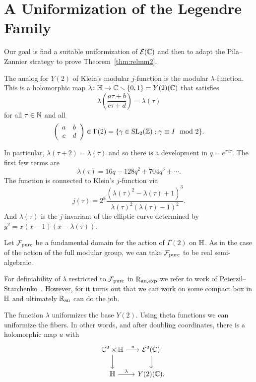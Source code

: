 \section{A Uniformization of the Legendre Family}
\label{sec:unilegendre}
Our goal is find a suitable uniformization of ${\mathcal E}({\mathbb{C}})$ and then
to adapt the Pila--Zannier strategy to prove Theorem~\ref{thm:relmm2}.

The analog for $Y(2)$ of Klein's modular $j$-function is the modular
$\lambda$-function. This is a holomorphic map $\lambda\colon
{\mathbb{H}}\rightarrow{\mathbb{C}}\smallsetminus\{0,1\}=Y(2)({\mathbb{C}})$ that satisfies
\begin{equation*}
  \lambda\left(\frac{a\tau+b}{c\tau +d}\right) = \lambda(\tau)
\end{equation*}
for all $\tau\in{\mathbb{N}}$ and all
\begin{equation*}
  \left( \begin{array}{cc} {a} & {b} \\ {c} & {d} \end{array} \right)  \in \Gamma(2) = \{\gamma \in
  \mathrm{SL}_{2}({\mathbb{Z}}) : \gamma\equiv I \mod 2\}.
\end{equation*}

In particular, $\lambda(\tau+2)=\lambda(\tau)$ and so there is a
development in $q = e^{\pi i \tau}$. The first few terms are
\begin{equation*}
  \lambda(\tau) = 16q - 128q^2 + 704q^3 +\cdots. 
\end{equation*}
The function is connected to Klein's $j$-function via
\begin{equation*}
  j(\tau) = 2^8
  \frac{(\lambda(\tau)^2-\lambda(\tau)+1)^3}{\lambda(\tau)^2(\lambda(\tau)-1)^2}. 
\end{equation*}
And $\lambda(\tau)$ is the $j$-invariant of the elliptic curve
determined by $y^2 = x(x-1)(x-\lambda(\tau))$.

Let ${\mathcal F}_{\mathrm{pure}}$ be a fundamental domain for the action of $\Gamma(2)$ on
${\mathbb{H}}$. As in the case of the action of the full modular group, we can
take ${\mathcal F}_{\mathrm{pure}}$ to be real semi-algebraic.

For definiability of $\lambda$ restricted to ${\mathcal F}_{\mathrm{pure}}$  in
${{\mathbb{R}}_{\mathrm{an,exp}}}$ we refer to work of Peterzil--Starchenko~\cite{PS:Duke13}.
However, for it turns out that we can work on some compact box in
${\mathbb{H}}$ and ultimately ${{\mathbb{R}}_{\mathrm{an}}}$ can do the job. 

The function $\lambda$ uniformizes the base $Y(2)$. 
Using theta functions we can uniformize the fibers. In other words,
and after doubling coordinates,
there is a holomorphic map $u$ with
\begin{equation*}
  \begin{tikzcd}[column sep=small, row sep=small] 
    & \IC^2\times\IH  \arrow{dd}{} \arrow{r}{u} & \cE^2(\IC)\arrow{dd}{}\\
    &  &\\
    &    \IH \arrow{r}{\lambda}  & Y(2)(\IC).
  \end{tikzcd}
\end{equation*}

